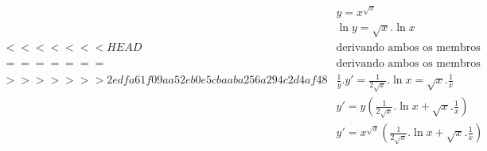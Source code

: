 \begin{ex}
\begin{align}
&y=x^{\sqrt{x}}\nonumber\\
&\ln{y}=\sqrt{x}.\ln{x}\nonumber\\
<<<<<<< HEAD
&\text{derivando ambos os membros da equa��o, temos:}\nonumber\\
=======
&\text{derivando ambos os membros da equa��o, temos:}\nonumber\\
>>>>>>> 2edfa61f09aa52eb0e5cbaaba256a294c2d4af48
&\frac{1}{y}.y'=\frac{1}{2\sqrt{x}}.\ln{x}=\sqrt{x}.\frac{1}{x}\nonumber\\
&y'=y\left(\frac{1}{2\sqrt{x}}.\ln{x}+\sqrt{x}.\frac{1}{x}\right)\nonumber\\
&y'=x^{\sqrt{x}}\left(\frac{1}{2\sqrt{x}}.\ln{x}+\sqrt{x}.\frac{1}{x}\right)\nonumber
\end{align}
\end{ex}